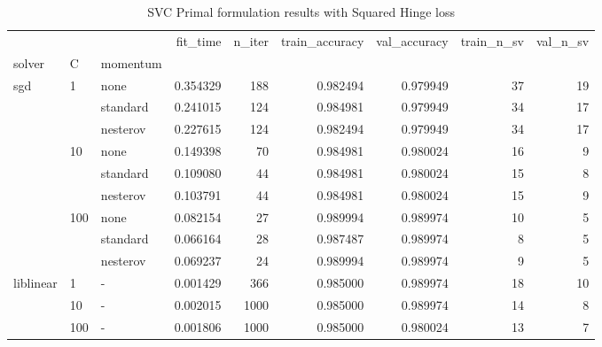 \begin{table}[H]
\centering
\caption{SVC Primal formulation results with Squared Hinge loss}
\label{primal_svc_squared_hinge_cv_results}
\begin{tabular}{lllrrrrrr}
\toprule
          &     &   &  fit\_time &  n\_iter &  train\_accuracy &  val\_accuracy &  train\_n\_sv &  val\_n\_sv \\
solver & C & momentum &           &         &                 &               &             &           \\
\midrule
sgd & 1   & none &  0.354329 &     188 &        0.982494 &      0.979949 &          37 &        19 \\
          &     & standard &  0.241015 &     124 &        0.984981 &      0.979949 &          34 &        17 \\
          &     & nesterov &  0.227615 &     124 &        0.982494 &      0.979949 &          34 &        17 \\
          & 10  & none &  0.149398 &      70 &        0.984981 &      0.980024 &          16 &         9 \\
          &     & standard &  0.109080 &      44 &        0.984981 &      0.980024 &          15 &         8 \\
          &     & nesterov &  0.103791 &      44 &        0.984981 &      0.980024 &          15 &         9 \\
          & 100 & none &  0.082154 &      27 &        0.989994 &      0.989974 &          10 &         5 \\
          &     & standard &  0.066164 &      28 &        0.987487 &      0.989974 &           8 &         5 \\
          &     & nesterov &  0.069237 &      24 &        0.989994 &      0.989974 &           9 &         5 \\
liblinear & 1   & - &  0.001429 &     366 &        0.985000 &      0.989974 &          18 &        10 \\
          & 10  & - &  0.002015 &    1000 &        0.985000 &      0.989974 &          14 &         8 \\
          & 100 & - &  0.001806 &    1000 &        0.985000 &      0.980024 &          13 &         7 \\
\bottomrule
\end{tabular}
\end{table}
